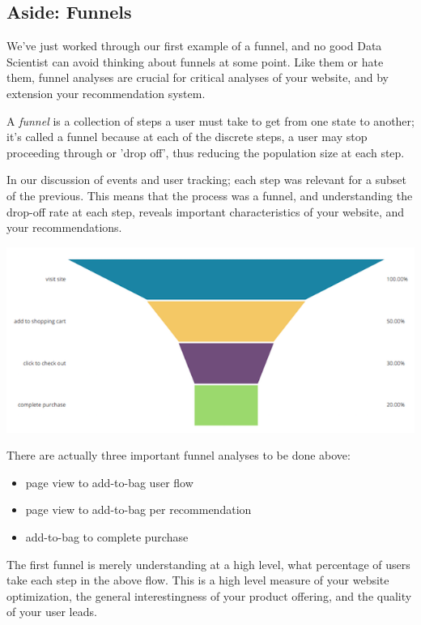 \subsection{Aside: Funnels}

We've just worked through our first example of a funnel, and no good Data Scientist can avoid thinking about funnels at some point. Like them or hate them, funnel analyses are crucial for critical analyses of your website, and by extension your recommendation system.


\vspace{10pt}
\colorbox{almond}{\parbox{\textwidth-20pt}{ A \emph{funnel} is a collection of steps a user must take to get from one state to another; it's called a funnel because at each of the discrete steps, a user may stop proceeding through or 'drop off', thus reducing the population size at each step.
}}

\vspace{10pt}
In our discussion of events and user tracking; each step was relevant for a subset of the previous. This means that the process was a funnel, and understanding the drop-off rate at each step, reveals important characteristics of your website, and your recommendations.

\vspace{10pt}
\includegraphics[width=\textwidth-10pt]{book-text/funnel.png}

There are actually three important funnel analyses to be done above:

\begin{itemize}
\item page view to add-to-bag user flow
\item page view to add-to-bag per recommendation
\item add-to-bag to complete purchase
\end{itemize}

The first funnel is merely understanding at a high level, what percentage of users take each step in the above flow. This is a high level measure of your website optimization, the general interestingness of your product offering, and the quality of your user leads.

